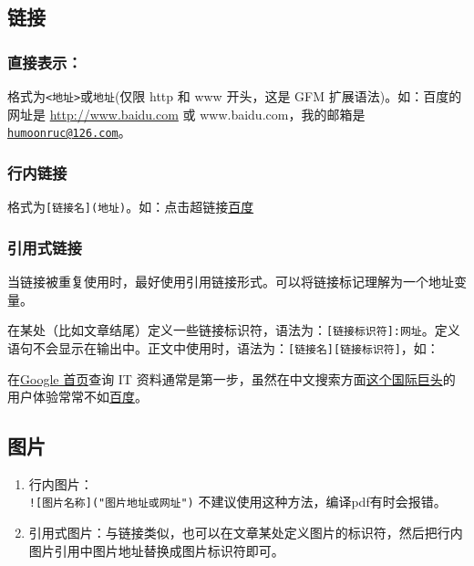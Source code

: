 \documentclass[]{article}
\begin{document}
\hypertarget{section-11}{%
\subsection{链接}\label{section-11}}

\hypertarget{section-12}{%
\subsubsection{直接表示：}\label{section-12}}

格式为\texttt{\textless{}地址\textgreater{}}或\texttt{地址}(仅限 http 和 www 开头，这是 GFM 扩展语法)。如：百度的网址是 \url{http://www.baidu.com} 或 www.baidu.com，我的邮箱是 \href{mailto:humoonruc@126.com}{\nolinkurl{humoonruc@126.com}}。

\hypertarget{section-13}{%
\subsubsection{行内链接}\label{section-13}}

格式为\texttt{{[}链接名{]}(地址)}。如：点击超链接\href{http://www.baidu.com}{百度}

\hypertarget{section-14}{%
\subsubsection{引用式链接}\label{section-14}}

当链接被重复使用时，最好使用引用链接形式。可以将链接标记理解为一个地址变量。

在某处（比如文章结尾）定义一些链接标识符，语法为：\texttt{{[}链接标识符{]}:网址}。定义语句不会显示在输出中。正文中使用时，语法为：\texttt{{[}链接名{]}{[}链接标识符{]}}，如：

在\href{https://www.google.com.hk}{Google 首页}查询 IT 资料通常是第一步，虽然在中文搜索方面\href{https://www.google.com.hk}{这个国际巨头}的用户体验常常不如\href{https://www.baidu.com}{百度}。

\hypertarget{section-15}{%
\subsection{图片}\label{section-15}}

\begin{enumerate}
\def\labelenumi{\arabic{enumi}.}
\item
  行内图片：\\
  \texttt{!{[}图片名称{]}("图片地址或网址")}
  不建议使用这种方法，编译pdf有时会报错。
\item
  引用式图片：与链接类似，也可以在文章某处定义图片的标识符，然后把行内图片引用中图片地址替换成图片标识符即可。
\end{enumerate}
\end{document}
